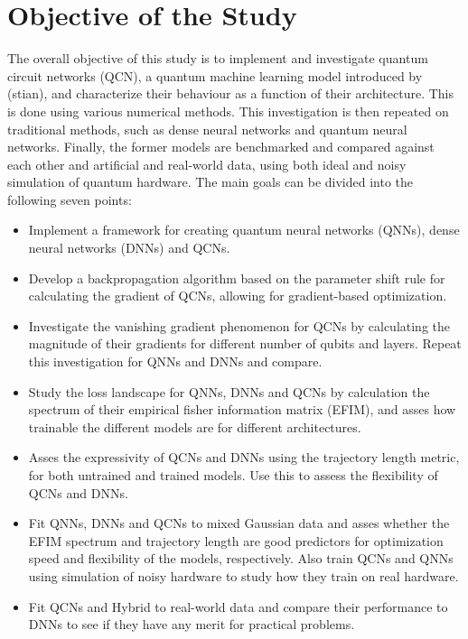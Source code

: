\section{Objective of the Study}
The overall objective of this study is to implement and investigate quantum circuit networks (QCN), a quantum machine learning model introduced by (stian), and characterize their behaviour as a function of their architecture. This is done using various numerical methods. This investigation is then repeated on traditional methods, such as dense neural networks and quantum neural networks. Finally, the former models are benchmarked and compared against each other and artificial and real-world data, using both ideal and noisy simulation of quantum hardware. The main goals can be divided into the following seven points:

\begin{itemize}
    \item Implement a framework for creating quantum neural networks (QNNs), dense neural networks (DNNs) and QCNs.
    
    \item Develop a backpropagation algorithm based on the parameter shift rule for calculating the gradient of QCNs, allowing for gradient-based optimization. 
    
    \item Investigate the vanishing gradient phenomenon for QCNs by calculating the magnitude of their gradients for different number of qubits and layers. Repeat this investigation for QNNs and DNNs and compare.
    
    \item Study the loss landscape for QNNs, DNNs and QCNs by calculation the spectrum of their empirical fisher information matrix (EFIM), and asses how trainable the different models are for different architectures.
    
    \item Asses the expressivity of QCNs and DNNs using the trajectory length metric, for both untrained and trained models. Use this to assess the flexibility of QCNs and DNNs. 
    
    \item Fit QNNs, DNNs and QCNs to mixed Gaussian data and asses whether the EFIM spectrum and trajectory length are good predictors for optimization speed and flexibility of the models, respectively. Also train QCNs and QNNs using simulation of noisy hardware to study how they train on real hardware.
    
    \item Fit QCNs and Hybrid to real-world data and compare their performance to DNNs to see if they have any merit for practical problems. 
\end{itemize}